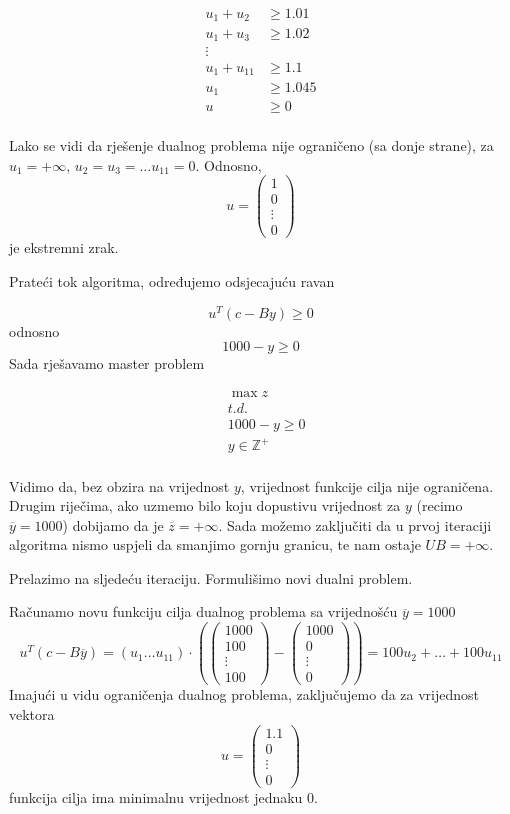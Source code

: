 \documentclass[a4paper, utf8, 11pt, colorlinks]{book}
\theoremstyle{definition}
\begin{document}
$$
\begin{aligned}
	u_1+u_2&\geqslant 1.01\\
	u_1+u_3&\geqslant 1.02\\
	\vdots&\\
	u_1+u_{11}&\geqslant 1.1\\
	u_1&\geqslant 1.045\\ 
	u&\geqslant 0\\
\end{aligned}
$$

Lako se vidi da rješenje dualnog problema nije ograničeno (sa donje strane), za $u_1 = +\infty$, $u_2 = u_3=\ldots u_{11}=0$.
Odnosno, 
$$u=\left(\begin{array}{c}
 1 \\
	0 \\
	\vdots \\
	0
\end{array}\right)$$ je ekstremni zrak.

Prateći tok algoritma, određujemo odsjecajuću ravan

$$u^{T}(c-By)\geqslant 0$$
odnosno
$$1000-y\geqslant 0$$
Sada rješavamo master problem


\begin{align*}
	&\max z\\
	&t.d. \\
	&1000-y\geqslant 0\\
	&y\in\mathbb{Z}^+\\	
\end{align*}


Vidimo da, bez obzira na vrijednost $y$, vrijednost funkcije cilja nije ograničena.
Drugim riječima, ako uzmemo bilo koju dopustivu vrijednost za $y$ (recimo $\overline{y}=1000$) dobijamo da je $\overline{z} = +\infty$. Sada možemo zaključiti da u prvoj iteraciji algoritma nismo uspjeli da smanjimo gornju granicu, te nam ostaje $UB = +\infty$.

 Prelazimo na sljedeću iteraciju. Formulišimo novi dualni problem.
 
  Računamo novu funkciju cilja dualnog problema sa vrijednošću $\overline{y}=1000$
 $$
 u^T (c-B\overline{y})=(u_1\ldots u_{11})\cdot \left(\left(\begin{array}{c}
 	1000 \\
 	100 \\
 	\vdots \\
 	100
 \end{array}\right)-\left(\begin{array}{c}
 	1000 \\
 	0 \\
 	\vdots \\
 	0
 \end{array}\right)\right) = 100u_2+\ldots+100u_{11}
 $$
 Imajući u vidu ograničenja dualnog problema, zaključujemo da za vrijednost vektora $$u=\left(\begin{array}{c}
 	1.1 \\
 	0 \\
 	\vdots \\
 	0
 \end{array}\right)$$
funkcija cilja ima minimalnu vrijednost jednaku 0.
\end{document}
